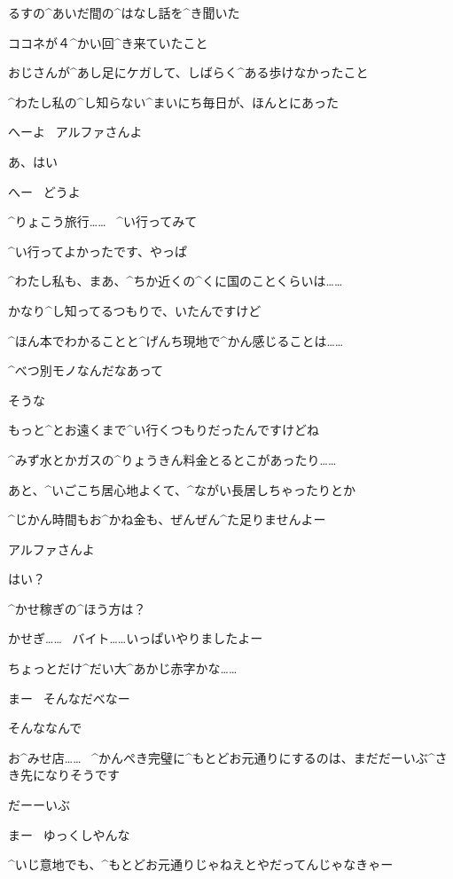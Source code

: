 \page
\Alpha るすの^{あいだ}{間}の^{はなし}{話}を^{き}{聞}いた

\Alpha ココネが４^{かい}{回}^{き}{来}ていたこと

\Alpha おじさんが^{あし}{足}にケガして、しばらく^{ある}{歩}けなかったこと

\Alpha ^{わたし}{私}の^{し}{知}らない^{まいにち}{毎日}が、ほんとにあった

\page
\Ojisan へーよ
\ アルファさんよ

\Alpha あ、はい

\Ojisan へー
\ どうよ

\Ojisan ^{りょこう}{旅行}……
\ ^{い}{行}ってみて

\Alpha ^{い}{行}ってよかったです、やっぱ

\Alpha ^{わたし}{私}も、まあ、^{ちか}{近}くの^{くに}{国}のことくらいは……

\Alpha かなり^{し}{知}ってるつもりで、いたんですけど

\page
\Alpha ^{ほん}{本}でわかることと^{げんち}{現地}で^{かん}{感}じることは……

\Alpha ^{べつ}{別}モノなんだなあって

\Ojisan そうな

\page
\Alpha もっと^{とお}{遠}くまで^{い}{行}くつもりだったんですけどね

\Alpha ^{みず}{水}とかガスの^{りょうきん}{料金}とるとこがあったり……

\Alpha あと、^{いごこち}{居心地}よくて、^{ながい}{長居}しちゃったりとか

\Alpha ^{じかん}{時間}もお^{かね}{金}も、ぜんぜん^{た}{足}りませんよー

\page
\Ojisan アルファさんよ

\Alpha はい？

\Ojisan ^{かせ}{稼}ぎの^{ほう}{方}は？

\Alpha かせぎ……
\ バイト……いっぱいやりましたよー

\Alpha ちょっとだけ^{だい}{大}^{あかじ}{赤字}かな……

\Ojisan まー
\ そんなだべなー

\page
\Alpha そんななんで

\Alpha お^{みせ}{店}……
\ ^{かんぺき}{完璧}に^{もとどお}{元通}りにするのは、まだだーいぶ^{さき}{先}になりそうです

\Alpha だーーいぶ

\Ojisan まー
\ ゆっくしやんな

\Ojisan ^{いじ}{意地}でも、^{もとどお}{元通}りじゃねえとやだってんじゃなきゃー

